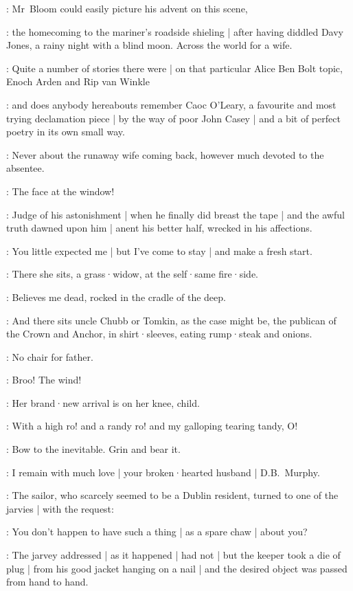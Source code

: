 :
Mr~Bloom could easily picture his advent on this scene,

:
the homecoming to the mariner's roadside shieling |
after having diddled Davy Jones,
a rainy night with a blind moon.
Across the world for a wife.

:
Quite a number of stories there were |
on that particular Alice Ben Bolt topic,
Enoch Arden and Rip van Winkle

:
and does anybody hereabouts remember Caoc O'Leary,
a favourite and most trying declamation piece |
by the way of poor John Casey |
and a bit of perfect poetry in its own small way.

:
Never about the runaway wife coming back,
however much devoted to the absentee.

:
The face at the window!%

:
Judge of his astonishment |
when he finally did breast the tape |
and the awful truth dawned upon him |
anent his better half,
wrecked in his affections.

:
You little expected me |
but I've come to stay |
and make a fresh start.

:
There she sits,
a grass·widow,
at the self·same fire·side.

:
Believes me dead,
rocked in the cradle of the deep.

:
And there sits uncle Chubb or Tomkin,
as the case might be,
the publican of the Crown and Anchor,
in shirt·sleeves,
eating rump·steak and onions.

:
No chair for father.

:
Broo!
The wind!

:
Her brand·new arrival is on her knee,
 child.

:
With a high ro!
and a randy ro!
and my galloping tearing tandy,
O!

:
Bow to the inevitable.
Grin and bear it.

:
I remain with much love |
your broken·hearted husband |
D.B.~Murphy.%

:
The sailor,
who scarcely seemed to be a Dublin resident,
turned to one of the jarvies |
with the request:

\Murphy:
You don't happen to have such a thing |
as a spare chaw |
about you?

:
The jarvey addressed |
as it happened |
had not |
but the keeper took a die of plug |
from his good jacket hanging on a nail |
and the desired object was passed from hand to hand.

